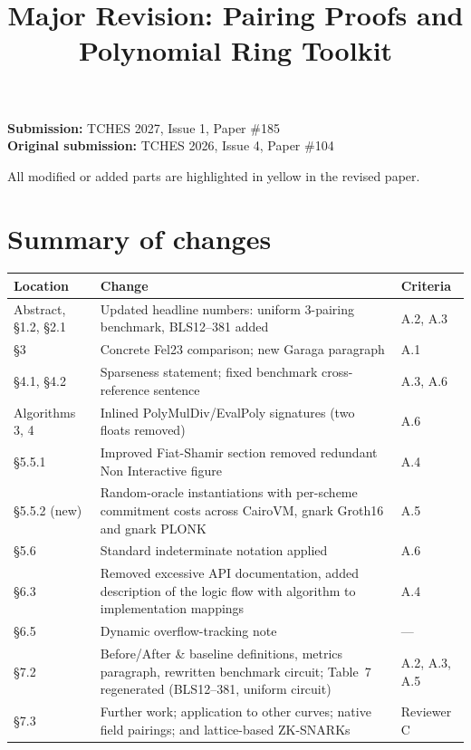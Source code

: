 \documentclass[10pt,a4paper]{article}
\title{Major Revision: Pairing Proofs and Polynomial Ring Toolkit}
\author{}
\date{}
\begin{document}
\maketitle
\vspace{-1.4cm}

\noindent\textbf{Submission:} TCHES 2027, Issue 1, Paper \#185
\\
\textbf{Original submission:} TCHES 2026, Issue 4, Paper \#104

All modified or added parts are \colorbox{yellow!45}{highlighted in yellow} in the revised
paper.
\\

\section*{Summary of changes}

\renewcommand{\arraystretch}{1.25}
\noindent\begin{tabularx}{\textwidth}{|l|X|l|}
\hline
\textbf{Location} & \textbf{Change} & \textbf{Criteria} \\
\hline
Abstract, \S1.2, \S2.1 & Updated headline numbers: uniform 3-pairing benchmark, BLS12--381 added & A.2, A.3 \\
\rowcolor{black!10} \S3 & Concrete Fel23 comparison; new Garaga paragraph & A.1 \\
\S4.1, \S4.2 & Sparseness statement; fixed benchmark cross-reference sentence & A.3, A.6 \\
\rowcolor{black!10} Algorithms 3, 4 & Inlined PolyMulDiv/EvalPoly signatures (two floats removed) & A.6 \\
\S5.5.1 & Improved Fiat-Shamir section removed redundant Non Interactive figure & A.4 \\
\rowcolor{black!10} \S5.5.2 (new) & Random-oracle instantiations with per-scheme commitment costs across CairoVM, gnark Groth16 and gnark PLONK & A.5 \\
\S5.6 & Standard indeterminate notation applied & A.6 \\
\rowcolor{black!10} \S6.3 & Removed excessive API documentation, added description of the logic flow with algorithm to implementation mappings & A.4 \\
\S6.5 & Dynamic overflow-tracking note & --- \\
\rowcolor{black!10} \S7.2 & Before/After \& baseline definitions, metrics paragraph, rewritten benchmark circuit; Table~7 regenerated (BLS12--381, uniform circuit) & A.2, A.3, A.5 \\
\S7.3 & Further work; application to other curves; native field pairings; and lattice-based ZK-SNARKs & Reviewer C \\
\hline
\end{tabularx}
\end{document}
